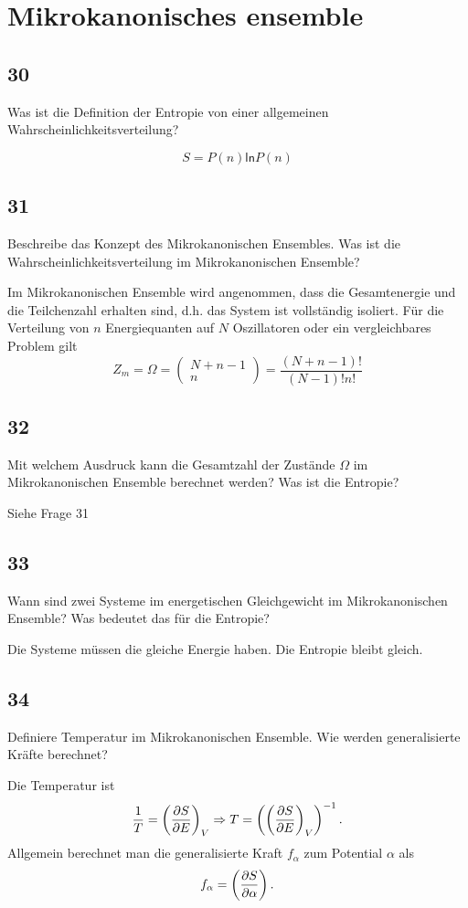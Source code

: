 \documentclass[12pt,a4paper]{report}
\newcommand{\logn}{\mathsf{ln}}
\newcommand{\partdd}[2]{\ensuremath {\left(\frac{\partial #1}{\partial #2}}\right)}
\newcommand{\partddd}[3]{\ensuremath {\left(\frac{\partial #1}{\partial #2}}\right)_{#3}}
\newcommand{\binkoef}[2]{\left(\begin{array}{c}{#1}\\{#2}\end{array}\right)}
\newenvironment{myfrag}{\begin{it}}{\end{it}\vspace{3mm}\par}
\numberwithin{equation}{section}
\begin{document}
\section{Mikrokanonisches ensemble}
\subsection{30}
\begin{myfrag}
Was ist die Definition der Entropie von einer allgemeinen Wahrscheinlichkeitsverteilung?
\end{myfrag}
\begin{equation}
	S=P(n)\logn P(n)
\end{equation}
\subsection{31}
\begin{myfrag}
Beschreibe das Konzept des Mikrokanonischen Ensembles. Was ist die
Wahrscheinlichkeitsverteilung im Mikrokanonischen Ensemble?
\end{myfrag}
Im Mikrokanonischen Ensemble wird angenommen, dass die Gesamtenergie und die Teilchenzahl erhalten sind, d.h. das System ist vollständig isoliert. Für die Verteilung von $n$ Energiequanten auf $N$ Oszillatoren oder ein vergleichbares Problem gilt
\begin{equation}
	Z_m=\Omega=\binkoef{N+n-1}{n}=\frac{(N+n-1)!}{(N-1)!n!}
\end{equation}
\subsection{32}
\begin{myfrag}
Mit welchem Ausdruck kann die Gesamtzahl der Zustände $\Omega$ im
Mikrokanonischen Ensemble berechnet werden? Was ist die Entropie?
\end{myfrag}
Siehe Frage 31 %
\subsection{33}
\begin{myfrag}
Wann sind zwei Systeme im energetischen Gleichgewicht im Mikrokanonischen
Ensemble? Was bedeutet das für die Entropie?
\end{myfrag}
Die Systeme müssen die gleiche Energie haben. Die Entropie bleibt gleich. %
\subsection{34}
\begin{myfrag}
Definiere Temperatur im Mikrokanonischen Ensemble. Wie werden
generalisierte Kräfte berechnet?
\end{myfrag}
Die Temperatur ist
\begin{equation}
	\frac{1}{T}=\partddd SEV \Rightarrow T=\left(\partddd SEV\right)^{-1}.
\end{equation}
Allgemein berechnet man die generalisierte Kraft $f_\alpha$ zum Potential $\alpha$ als
\begin{equation}
	f_\alpha=\partdd S\alpha .
\end{equation}
\end{document}
